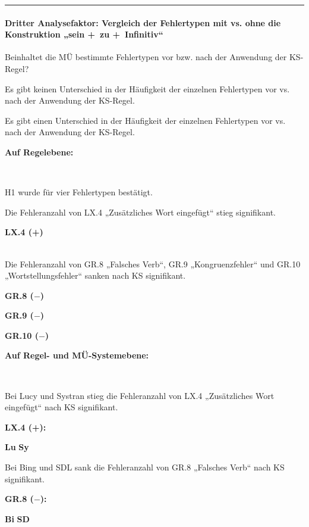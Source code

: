 \hrule
\paragraph*{Dritter Analysefaktor: Vergleich der Fehlertypen mit vs. ohne die Konstruktion „sein +~zu +~Infinitiv“}
\begin{description}[font=\normalfont\bfseries]
\item [Fragestellung:] Beinhaltet die MÜ bestimmte Fehlertypen vor bzw. nach der Anwendung der KS-Regel?
\item [H0 --] Es gibt keinen Unterschied in der Häufigkeit der einzelnen Fehlertypen vor vs. nach der Anwendung der KS-Regel.
\item [H1 --] Es gibt einen Unterschied in der Häufigkeit der einzelnen Fehlertypen vor vs. nach der Anwendung der KS-Regel.
\item [Resultat]
\end{description}
\noindent
\parbox[t]{.8\textwidth}{\textbf{Auf Regelebene:}}\\
\parbox[t]{.8\textwidth}{
H1 wurde für vier Fehlertypen bestätigt.

Die Fehleranzahl von LX.4 „Zusätzliches Wort eingefügt“ stieg signifikant.
}
\parbox[t]{.04\textwidth}{}
\colorbox{smGreen}{\parbox[t]{.15\textwidth}{
\textbf{LX.4 (+)}\\
\\
}}

\medskip
\noindent
\parbox[t]{.8\textwidth}{
Die Fehleranzahl von GR.8 „Falsches Verb“, GR.9 „Kongruenzfehler“ und GR.10 „Wortstellungsfehler“ sanken nach KS signifikant.
}
\parbox[t]{.04\textwidth}{}
\colorbox{smGreen}{\parbox[t]{.15\textwidth}{
{ \textbf{GR.8 ($-$)} }

{ \textbf{GR.9 ($-$)}}

 \textbf{GR.10 ($-$)}
}}

\noindent
\parbox[t]{.8\textwidth}{\textbf{Auf Regel- und MÜ-Systemebene:}}\\
\parbox[t]{.8\textwidth}{
Bei Lucy und Systran stieg die Fehleranzahl von LX.4 „Zusätzliches Wort eingefügt“ nach KS signifikant.
}
\parbox[t]{.04\textwidth}{}
\colorbox{smGreen}{\parbox[t]{.15\textwidth}{
{ \textbf{LX.4 (+):}}

{ \textbf{Lu}} \textbf{Sy}
}}

\medskip
\noindent
\parbox[t]{.8\textwidth}{
Bei Bing und SDL sank die Fehleranzahl von GR.8 „Falsches Verb“ nach KS signifikant.
}
\parbox[t]{.04\textwidth}{}
\colorbox{smGreen}{\parbox[t]{.15\textwidth}{
{ \textbf{GR.8 ($-$):}}

{ \textbf{Bi}} \textbf{SD}
}}

